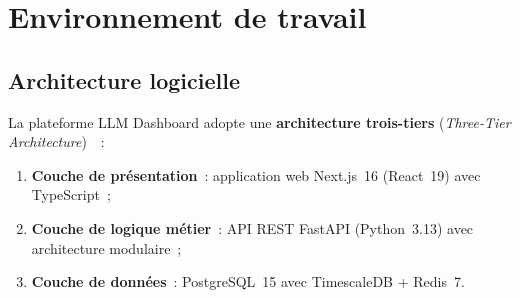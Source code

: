 \section{Environnement de travail}
\label{sec:environnement}

\subsection{Architecture logicielle}

La plateforme LLM Dashboard adopte une \textbf{architecture trois-tiers} (\textit{Three-Tier Architecture})~\cite{martin2018}~:

\begin{enumerate}[noitemsep]
    \item \textbf{Couche de présentation}~: application web Next.js~16 (React~19) avec TypeScript~;
    \item \textbf{Couche de logique métier}~: API REST FastAPI (Python~3.13) avec architecture modulaire~;
    \item \textbf{Couche de données}~: PostgreSQL~15 avec TimescaleDB + Redis~7.
\end{enumerate}

